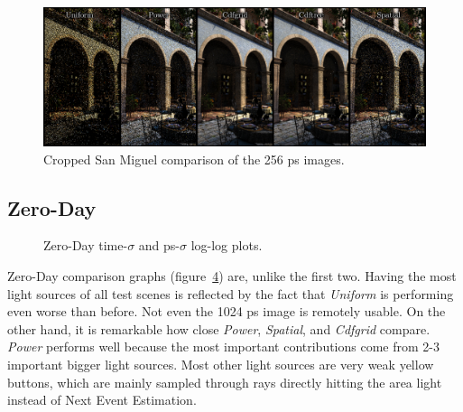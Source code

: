 \begin{figure}
    \centering
    \includegraphics[width=1\textwidth]{figures/comparisons/Mig_comp_same_slimmer.pdf}
    \caption{Cropped San Miguel comparison of the 256 ps images.}
    \label{fig:migcomp}
\end{figure}

\FloatBarrier
\subsection{Zero-Day}
\begin{figure}
    \centering
    \begin{subfigure}{.5\textwidth}
      \centering
        \caption{}
        \label{fig:zd_t}
    \end{subfigure}%
    \begin{subfigure}{.5\textwidth}
        \caption{}
        \label{fig:zd_ps}
    \end{subfigure}
    \caption{Zero-Day time-$\sigma$ and ps-$\sigma$ log-log plots.}
    \label{fig:zd}
\end{figure}

Zero-Day comparison graphs (figure~\ref{fig:zd}) are, unlike the first two. Having the most light sources of all test scenes is reflected by the fact that \textit{Uniform} is performing even worse than before. Not even the 1024 ps image is remotely usable. On the other hand, it is remarkable how close \textit{Power}, \textit{Spatial}, and \textit{Cdfgrid} compare. \textit{Power} performs well because the most important contributions come from 2-3 important bigger light sources. Most other light sources are very weak yellow buttons, which are mainly sampled through rays directly hitting the area light instead of Next Event Estimation.

